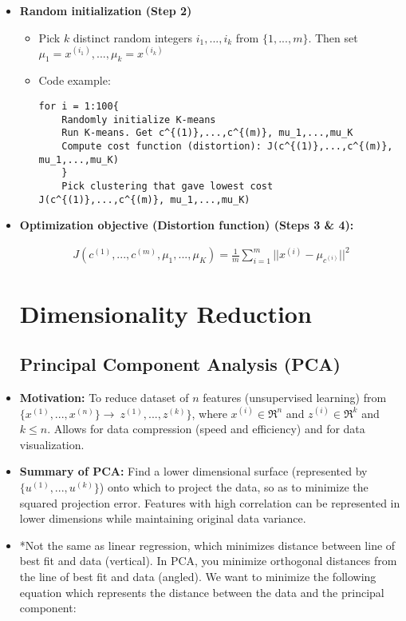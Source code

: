\documentclass[titlepage]{article}
\begin{document}
\begin{itemize}
\item \textbf{Random initialization (Step 2)}

\begin{itemize} [label=$\bullet$]
	\item Pick $k$ distinct random integers $i_1,...,i_k$ from $\{1,...,m\}$. Then set $\mu_1 = x^{(i_1)},...,\mu_k = x^{(i_k)}$
	\item Code example:
	\begin{Verbatim}[obeytabs]
	for i = 1:100{
	Randomly initialize K-means
	Run K-means. Get c^{(1)},...,c^{(m)}, mu_1,...,mu_K
	Compute cost function (distortion): J(c^{(1)},...,c^{(m)}, mu_1,...,mu_K)
	}
	Pick clustering that gave lowest cost J(c^{(1)},...,c^{(m)}, mu_1,...,mu_K)
	\end{Verbatim}
\end{itemize}

\item\textbf{Optimization objective (Distortion function) (Steps 3 \& 4):}

\begin{align*}
	J(c^{(1)},...,c^{(m)}, \mu_1,...,\mu_K) = \frac{1}{m} \sum_{i=1}^{m} ||x^{(i)} - \mu_{c^{(i)}} ||^2
\end{align*}

\section{Dimensionality Reduction}
\subsection{Principal Component Analysis (PCA)}

\item \textbf{Motivation:} To reduce dataset of $n$ features (unsupervised learning) from $\{x^{(1)},...,x^{(n)}\} \rightarrow \ z^{(1)},...,z^{(k)}\}$, where $x^{(i)} \in \Re^{n}$ and $z^{(i)} \in \Re^{k}$ and $k \leq n$. Allows for data compression (speed and efficiency) and for data visualization.


\item \textbf{Summary of PCA:} Find a lower dimensional surface (represented by $\{u^{(1)},...,u^{(k)}\}$) onto which to project the data, so as to minimize the squared projection error. Features with high correlation can be represented in lower dimensions while maintaining original data variance.

\item *Not the same as linear regression, which minimizes distance between line of best fit and data (vertical). In PCA, you minimize orthogonal distances from the line of best fit and data (angled). We want to minimize the following equation which represents the distance between the data and the principal component:


\end{itemize}
\end{document}

